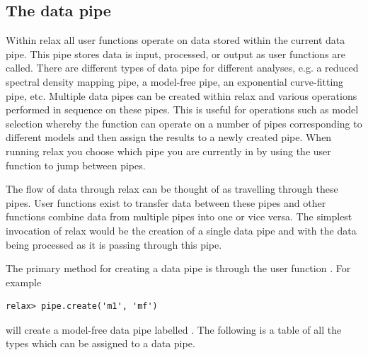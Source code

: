 
\subsection{The data pipe} \label{sect: the data pipe}

Within relax all user functions operate on data stored within the current data pipe.
This pipe stores data is input, processed, or output as user functions are called.
There are different types of data pipe for different analyses, e.g. a reduced spectral density mapping pipe, a model-free pipe, an exponential curve-fitting pipe, etc.
Multiple data pipes can be created within relax and various operations performed in sequence on these pipes.
This is useful for operations such as model selection whereby the function  can operate on a number of pipes corresponding to different models and then assign the results to a newly created pipe.
When running relax you choose which pipe you are currently in by using the  user function to jump between pipes.

The flow of data through relax can be thought of as travelling through these pipes.
User functions exist to transfer data between these pipes and other functions combine data from multiple pipes into one or vice versa.
The simplest invocation of relax would be the creation of a single data pipe and with the data being processed as it is passing through this pipe.

The primary method for creating a data pipe is through the user function .
For example

\begin{lstlisting}[numbers=none]
relax> pipe.create('m1', 'mf')
\end{lstlisting}

will create a model-free data pipe labelled .
The following is a table of all the types which can be assigned to a data pipe.

